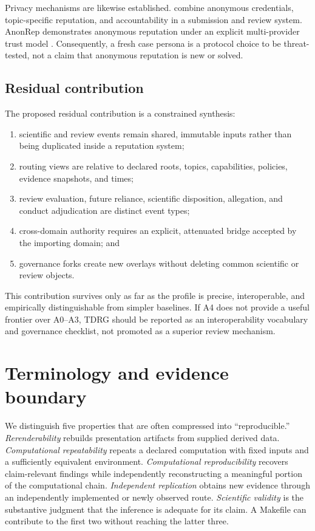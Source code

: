 \documentclass[11pt]{article}
\newcommand{\tdrg}{TDRG}
\begin{document}
Privacy mechanisms are likewise established. \citet{naessens2006fair} combine
anonymous credentials, topic-specific reputation, and accountability in a submission
and review system. AnonRep demonstrates anonymous reputation under an explicit
multi-provider trust model \citep{zhai2016anonrep}. Consequently, a fresh case
persona is a protocol choice to be threat-tested, not a claim that anonymous
reputation is new or solved.

\subsection{Residual contribution}

The proposed residual contribution is a constrained synthesis:

\begin{enumerate}
  \item scientific and review events remain shared, immutable inputs rather than
  being duplicated inside a reputation system;
  \item routing views are relative to declared roots, topics, capabilities,
  policies, evidence snapshots, and times;
  \item review evaluation, future reliance, scientific disposition, allegation,
  and conduct adjudication are distinct event types;
  \item cross-domain authority requires an explicit, attenuated bridge accepted by
  the importing domain; and
  \item governance forks create new overlays without deleting common scientific or
  review objects.
\end{enumerate}

This contribution survives only as far as the profile is precise, interoperable,
and empirically distinguishable from simpler baselines. If A4 does not provide a
useful frontier over A0--A3, \tdrg{} should be reported as an interoperability
vocabulary and governance checklist, not promoted as a superior review mechanism.

\section{Terminology and evidence boundary}

We distinguish five properties that are often compressed into ``reproducible.''
\emph{Rerenderability} rebuilds presentation artifacts from supplied derived data.
\emph{Computational repeatability} repeats a declared computation with fixed inputs
and a sufficiently equivalent environment. \emph{Computational reproducibility}
recovers claim-relevant findings while independently reconstructing a meaningful
portion of the computational chain. \emph{Independent replication} obtains new
evidence through an independently implemented or newly observed route.
\emph{Scientific validity} is the substantive judgment that the inference is
adequate for its claim. A Makefile can contribute to the first two without reaching
the latter three.
\end{document}
